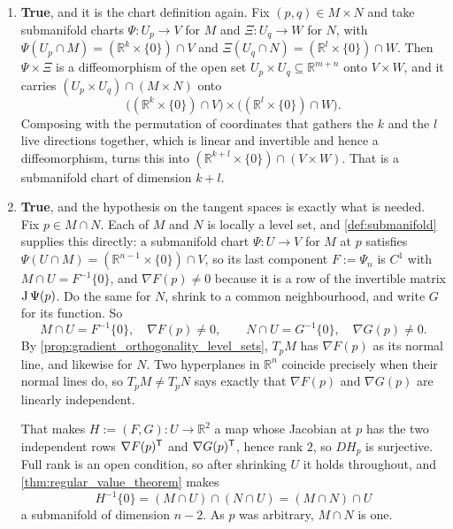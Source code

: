 \begin{exercisesolution}
\begin{enumerate}[label=\textbf{(\alph*)}]
    What goes wrong is that disjointness is not enough: the two pieces are disjoint but one of
    them accumulates on the other. Requiring instead that $M$ and $N$ have disjoint
    \emph{closures} makes the statement true, and then each point of the union has a
    neighbourhood meeting only one of the two.
  \item \textbf{True}, and it is the chart definition again. Fix $(p,q) \in M \times N$ and take
    submanifold charts $\Psi : U_p \to V$ for $M$ and $\Xi : U_q \to W$ for $N$, with
    $\Psi(U_p \cap M) = (\mathbb{R}^k\times\{0\})\cap V$ and
    $\Xi(U_q \cap N) = (\mathbb{R}^l\times\{0\})\cap W$. Then $\Psi\times\Xi$ is a
    diffeomorphism of the open set $U_p\times U_q \subseteq \mathbb{R}^{m+n}$ onto $V\times W$,
    and it carries $(U_p\times U_q) \cap (M\times N)$ onto
    \[\big((\mathbb{R}^k\times\{0\})\cap V\big) \times \big((\mathbb{R}^l\times\{0\})\cap W\big).\]
    Composing with the permutation of coordinates that gathers the $k$ and the $l$ live
    directions together, which is linear and invertible and hence a diffeomorphism, turns this
    into $(\mathbb{R}^{k+l}\times\{0\}) \cap (V\times W)$. That is a submanifold chart of
    dimension $k+l$.
  \item \textbf{True}, and the hypothesis on the tangent spaces is exactly what is needed. Fix
    $p \in M \cap N$. Each of $M$ and $N$ is locally a level set, and \cref{def:submanifold}
    supplies this directly: a submanifold chart $\Psi : U \to V$ for $M$ at $p$ satisfies
    $\Psi(U \cap M) = (\mathbb{R}^{n-1}\times\{0\}) \cap V$, so its last component
    $F := \Psi_n$ is $C^1$ with $M \cap U = F^{-1}\{0\}$, and $\nabla F(p) \neq 0$ because it is
    a row of the invertible matrix $\operatorname{J}\Psi(p)$. Do the same for $N$, shrink to a common
    neighbourhood, and write $G$ for its function. So
    \[M \cap U = F^{-1}\{0\}, \quad \nabla F(p) \neq 0, \qquad
      N \cap U = G^{-1}\{0\}, \quad \nabla G(p) \neq 0 .\]
    By \cref{prop:gradient_orthogonality_level_sets}, $T_pM$ has $\nabla F(p)$ as its
    normal line, and likewise for $N$. Two hyperplanes in $\mathbb{R}^n$ coincide precisely when
    their normal lines do, so $T_pM \neq T_pN$ says exactly that $\nabla F(p)$ and $\nabla G(p)$
    are linearly independent.

    That makes $H := (F,G) : U \to \mathbb{R}^2$ a map whose Jacobian at $p$ has the two
    independent rows $\nabla F(p)^{\mathsf{T}}$ and $\nabla G(p)^{\mathsf{T}}$, hence rank $2$, so $DH_p$ is
    surjective. Full rank is an open condition, so after shrinking $U$ it holds throughout, and
    \cref{thm:regular_value_theorem} makes
    \[H^{-1}\{0\} = (M\cap U) \cap (N \cap U) = (M\cap N)\cap U\]
    a submanifold of dimension $n-2$. As $p$ was arbitrary, $M \cap N$ is one.
\end{enumerate}


\end{exercisesolution}
